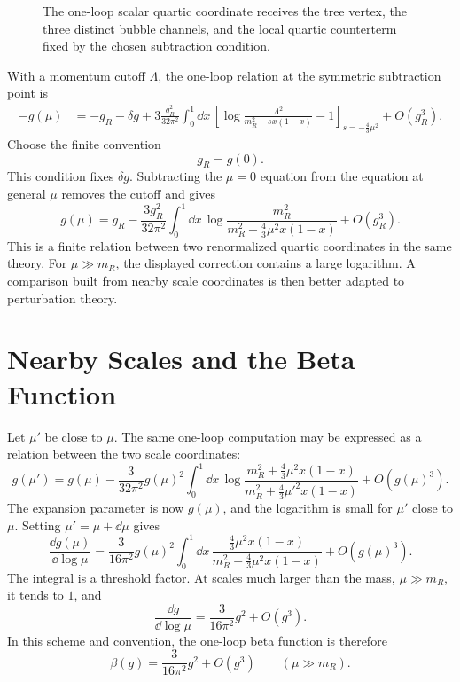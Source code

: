 \begin{figure}[H]
{
  }
  \caption{The one-loop scalar quartic coordinate receives the tree vertex,
  the three distinct bubble channels, and the local quartic counterterm fixed
  by the chosen subtraction condition.}
  \label{fig:volume-ii-phi-four-one-loop-rg}
\end{figure}

With a momentum cutoff \(\Lambda\), the one-loop relation at the symmetric
subtraction point is
\[
\begin{aligned}
  -g(\mu)
  &=
  -g_R-\delta g
  +
  3\frac{g_R^2}{32\pi^2}
  \int_0^1 \dd x\,
  \left[
    \log\frac{\Lambda^2}{m_R^2-sx(1-x)}-1
  \right]_{s=-\frac43\mu^2}
  +
  O(g_R^3).
\end{aligned}
\]
Choose the finite convention
\[
  g_R=g(0).
\]
This condition fixes \(\delta g\).  Subtracting the \(\mu=0\) equation from
the equation at general \(\mu\) removes the cutoff and gives
\[
  g(\mu)
  =
  g_R
  -
  \frac{3g_R^2}{32\pi^2}
  \int_0^1 \dd x\,
  \log
  \frac{m_R^2}
       {m_R^2+\frac43\mu^2x(1-x)}
  +
  O(g_R^3).
\]
This is a finite relation between two renormalized quartic coordinates in the
same theory.  For \(\mu\gg m_R\), the displayed correction contains a large
logarithm.  A comparison built from nearby scale coordinates is then better
adapted to perturbation theory.

\section{Nearby Scales and the Beta Function}

Let \(\mu'\) be close to \(\mu\).  The same one-loop computation may be
expressed as a relation between the two scale coordinates:
\[
  g(\mu')
  =
  g(\mu)
  -
  \frac{3}{32\pi^2}g(\mu)^2
  \int_0^1 \dd x\,
  \log
  \frac{m_R^2+\frac43\mu^2x(1-x)}
       {m_R^2+\frac43\mu'^2x(1-x)}
  +
  O(g(\mu)^3).
\]
The expansion parameter is now \(g(\mu)\), and the logarithm is small for
\(\mu'\) close to \(\mu\).  Setting \(\mu'=\mu+\dd\mu\) gives
\[
  \frac{\dd g(\mu)}{\dd\log\mu}
  =
  \frac{3}{16\pi^2}g(\mu)^2
  \int_0^1\dd x\,
  \frac{\frac43\mu^2x(1-x)}
       {m_R^2+\frac43\mu^2x(1-x)}
  +
  O(g(\mu)^3).
\]
The integral is a threshold factor.  At scales much larger than the mass,
\(\mu\gg m_R\), it tends to \(1\), and
\[
  \frac{\dd g}{\dd\log\mu}
  =
  \frac{3}{16\pi^2}g^2+O(g^3).
\]
In this scheme and convention, the one-loop beta function is therefore
\[
  \beta(g)=\frac{3}{16\pi^2}g^2+O(g^3)
  \qquad
  (\mu\gg m_R).
\]

